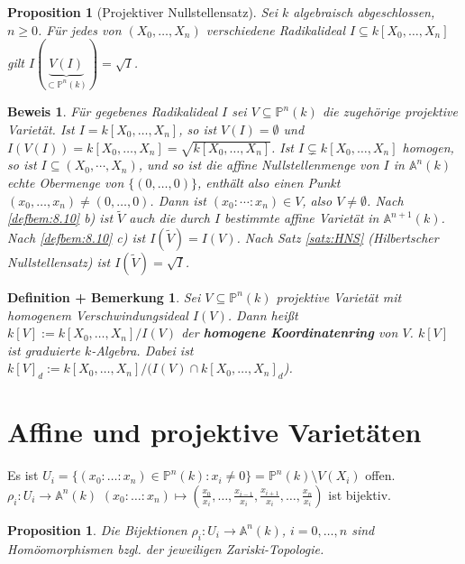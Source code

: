 \documentclass[a4paper,12pt]{report}
\theoremstyle{break}
\newtheorem{DefBem}[Def]{Definition + Bemerkung}
\newtheorem{Prop}[Def]{Proposition}
\theoremstyle{nonumberbreak}
\theoremstyle{nonumberplain}
\newtheorem{Bew}{Beweis}
\newcommand{\emp}[1]{\textbf{\emph{#1}}}
\newcommand{\begriff}[1]{{\index{#1}}\emp{#1}}
\begin{document}
\begin{Prop}[Projektiver Nullstellensatz]
\label{prop:8.9}
 Sei $k$ algebraisch abgeschlossen, $n \ge 0$. Für jedes von $(X_0, \dots, X_n)$ verschiedene Radikalideal $I \subseteq k[X_0,\dots,X_n]$ gilt $I(\underbrace{V(I)}_{\subset \mathbb P^n(k)})=\sqrt{I}$.
\end{Prop}
\begin{Bew}
Für gegebenes Radikalideal $I$ sei $V \subseteq \mathbb P^n(k)$ die zugehörige projektive Varietät. Ist $I = k[X_0, \dots, X_n]$, so ist $V(I) = \emptyset$ und $I(V(I))=k[X_0, \dots, X_n] = \sqrt{k[X_0, \dots, X_n]}$. Ist $I \subsetneq k[X_0, \dots, X_n]$ homogen, so ist $I\subseteq (X_0,\cdots,X_n)$, und so ist die affine Nullstellenmenge von $I$ in $\mathbb A^n(k)$ echte Obermenge von $\{(0,\dots, 0)\}$, enthält also einen Punkt $(x_0, \dots, x_n) \ne (0, \dots, 0)$. Dann ist $(x_0:\cdots :x_n)\in V$, also $V\ne\emptyset$.
Nach \ref{defbem:8.10} b) ist $\tilde{V}$ auch die durch $I$ bestimmte affine Varietät in $\mathbb A^{n+1}(k)$. Nach \ref{defbem:8.10} c) ist $I(\tilde{V})=I(V)$. Nach Satz \ref{satz:HNS} (Hilbertscher Nullstellensatz) ist $I(\tilde{V})=\sqrt{I}$.  
\end{Bew}
\begin{DefBem}
 \label{defbem:8.11}
Sei $V \subseteq \mathbb P^n(k)$ projektive Varietät mit homogenem Verschwindungsideal $I(V)$. Dann heißt $k[V]:=k[X_0, \dots, X_n]/I(V)$ der \begriff{homogene Koordinatenring} von $V$. $k[V]$ ist graduierte $k$-Algebra. Dabei ist $k[V]_d:=k[X_0, \dots, X_n]/(I(V) \cap k[X_0, \dots, X_n]_d$).
\end{DefBem}

\section{Affine und projektive Varietäten}
Es ist $U_i =\{(x_0: \dots: x_n)\in \mathbb P^n(k):x_i \ne 0\}=\mathbb P^n(k) \setminus V(X_i)$ offen.\\
$\rho_i:U_i \rightarrow \mathbb A^n(k)$ $(x_0: \dots: x_n) \mapsto (\frac{x_0}{x_i}, \dots , \frac{x_{i-1}}{x_i},\frac{x_{i+1}}{x_i}, \dots , \frac{x_n}{x_i})$ ist bijektiv.
\begin{Prop}
 \label{prop:9.1}
 Die Bijektionen $\rho_i:U_i \rightarrow \mathbb A^n(k)$, $i = 0, \dots, n$ sind Homöomorphismen bzgl. der jeweiligen Zariski-Topologie.
\end{Prop}


\end{document}
